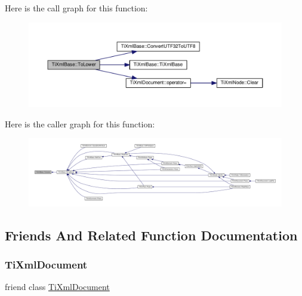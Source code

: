 Here is the call graph for this function\+:
\nopagebreak
\begin{figure}[H]
\begin{center}
\leavevmode
\includegraphics[width=350pt]{class_ti_xml_base_a799f17405a86a5c2029618e85f11a097_cgraph}
\end{center}
\end{figure}
Here is the caller graph for this function\+:
\nopagebreak
\begin{figure}[H]
\begin{center}
\leavevmode
\includegraphics[width=350pt]{class_ti_xml_base_a799f17405a86a5c2029618e85f11a097_icgraph}
\end{center}
\end{figure}


\subsection{Friends And Related Function Documentation}
\mbox{\label{class_ti_xml_base_a173617f6dfe902cf484ce5552b950475}} 
\subsubsection{\texorpdfstring{Ti\+Xml\+Document}{TiXmlDocument}}
{\footnotesize\ttfamily friend class \hyperlink{class_ti_xml_document}{Ti\+Xml\+Document}\hspace{0.3cm}{\ttfamily [friend]}}

\mbox{\label{class_ti_xml_base_ab6592e32cb9132be517cc12a70564c4b}} 
